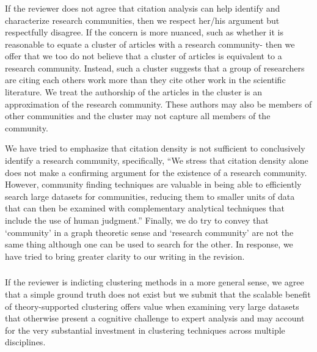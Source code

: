 \documentclass[11pt, oneside]{article}   	%
\begin{document}
\subsubsection{} If the reviewer does not agree that citation analysis can help identify and characterize research communities, then we respect her/his argument but respectfully disagree. If the concern is more nuanced, such as whether it is reasonable to equate a cluster of articles with a research community-  then we offer that we too do not believe that a cluster of articles is equivalent to a research community. Instead, such a cluster suggests that a group of researchers are citing each others work more than they cite other work in the scientific literature. We treat the authorship of the articles in the cluster is an approximation of the research community. These authors may also be members of other communities and the cluster may not capture all members of the community. 

We have tried to emphasize that citation density is not sufficient to conclusively identify a research community, specifically, ``We stress that citation density alone does not make a confirming argument for the existence of a research community. However, community finding techniques are valuable in being able to efficiently search large datasets for communities, reducing them to smaller units of data that can then be examined with complementary analytical techniques that include the use of human judgment.'' Finally, we do try to convey that `community' in a graph theoretic sense and `research community' are not the same thing although one can be used to search for the other.  In response, we have tried to bring greater clarity to our writing in the revision. 

\subsubsection{} If the reviewer is indicting clustering methods in a more general sense, we agree that a simple ground truth does not exist but we submit that the scalable benefit of theory-supported clustering offers value when examining very large datasets that otherwise present a cognitive challenge to expert analysis and may account for the very substantial investment in clustering techniques across multiple disciplines. 

\vspace {4mm}
\end{document}
